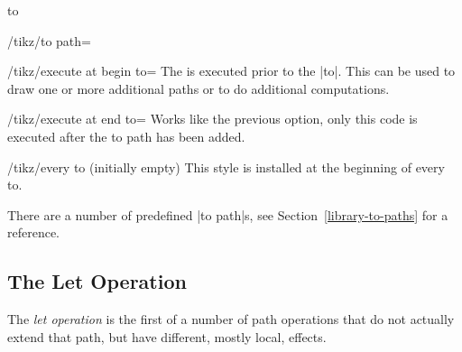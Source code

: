 \begin{pathoperation}{to}{
     }
\begin{key}{/tikz/to path=}
    \begin{key}{/tikz/execute at begin to=}
      The  is executed prior to the |to|. This can be used to
      draw one or more additional paths or to do additional
      computations.
    \end{key}

    \begin{key}{/tikz/execute at end to=}
      Works like the previous option, only this code is executed after
      the to path has been added.
    \end{key}


    \begin{stylekey}{/tikz/every to (initially \normalfont empty)}
      This style is installed at the beginning of every to.
    \end{stylekey}
  \end{key}
\end{pathoperation}

There are a number of predefined |to path|s, see
Section~\ref{library-to-paths} for a reference.


\subsection{The Let Operation}

The \emph{let operation} is the first of a number of path operations
that do not actually extend that path, but have different, mostly
local, effects.

